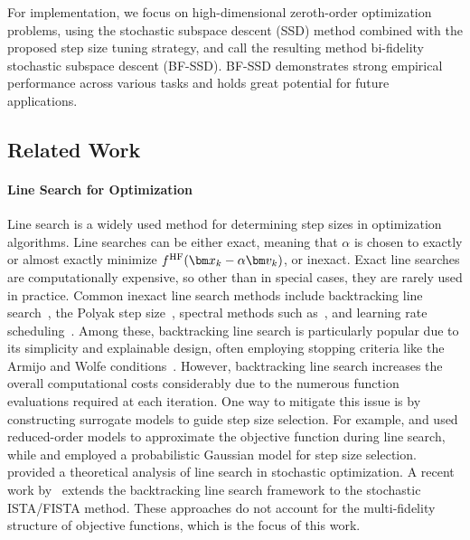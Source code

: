 \documentclass[10pt]{article} %
\numberwithin{equation}{section}
\theoremstyle{plain}
\theoremstyle{definition}
\newcommand{\<}{\langle}
\renewcommand{\>}{\rangle}
\renewcommand{\(}{\left(}
\renewcommand{\)}{\right)}
\renewcommand{\[}{\left[}
\renewcommand{\]}{\right]}
\newcommand{\HF}{\textup{HF}}
\begin{document}
For implementation, we focus on high-dimensional zeroth-order optimization problems, using the stochastic subspace descent (SSD) method \citep{kozak2021stochastic} combined with the proposed step size tuning strategy, and call the resulting method bi-fidelity stochastic subspace descent (BF-SSD). BF-SSD demonstrates strong empirical performance across various tasks and holds great potential for future applications.

\subsection{Related Work}
\label{ssec:related}

\paragraph{Line Search for Optimization}
Line search is a widely used method for determining step sizes in optimization algorithms.
Line searches can be either exact, meaning that $\alpha$ is chosen to exactly or almost exactly minimize $f^\HF(\bm x_k - \alpha \bm v_k)$, or inexact.  Exact line searches are computationally expensive, so other than in special cases, they are rarely used in practice. Common inexact line search methods include backtracking line search~\citep{nocedal1999numerical}, the Polyak step size~\citep{polyak1987introduction}, spectral methods such as~\citep{BarzilaiBorwein1988}, and learning rate scheduling~\citep{duchi2011adaptive}. Among these, backtracking line search is particularly popular due to its simplicity and explainable design, often employing stopping criteria like the Armijo and Wolfe conditions~\citep{nocedal1999numerical}. However, backtracking line search increases the overall computational costs considerably due to the numerous function evaluations required at each iteration. %
One way to mitigate this issue is by constructing surrogate models to guide step size selection. For example, \citet{yue2013accelerating} and \citet{grundvig2023line} used reduced-order models to approximate the objective function during line search, while \citet{Mahsereci2017b} and \citet{cartis2018global} employed a probabilistic Gaussian model for step size selection. \citet{paquette2020stochastic} provided a theoretical analysis of line search in stochastic optimization. A recent work by~\citet{Nguyen_Scheinberg_2025stochasticStepSize} extends the backtracking line search framework to the stochastic ISTA/FISTA method.
These approaches do not account for the multi-fidelity structure of objective functions, which is the focus of this work.
\end{document}
